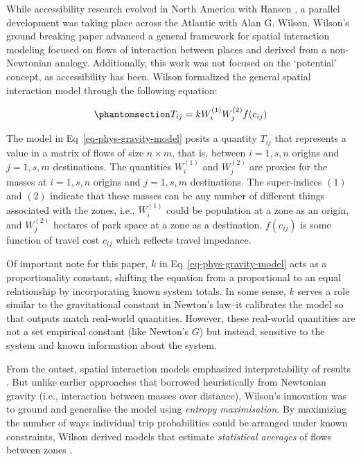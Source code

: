 \documentclass[
  10pt,
  letterpaper,
]{article}
\begin{document}
While accessibility research evolved in North America with Hansen
\citep{hansen1959}, a parallel development was taking place across the
Atlantic with Alan G. Wilson. Wilson's ground breaking paper
\citep{wilson1971} advanced a general framework for spatial interaction
modeling focused on flows of interaction between places and derived from
a non-Newtonian analogy. Additionally, this work was not focused on the
`potential' concept, as accessibility has been. Wilson
\citep{wilson1971} formalized the general spatial interaction model
through the following equation:

\begin{equation}\phantomsection\label{eq-phys-gravity-model}{
T_{ij} = k W_i^{(1)} W_j^{(2)} f(c_{ij})
}\end{equation}

The model in Eq~\ref{eq-phys-gravity-model} posits a quantity \(T_{ij}\)
that represents a value in a matrix of flows of size \(n \times m\),
that is, between \(i = 1,s, n\) origins and \(j = 1,s, m\) destinations.
The quantities \(W_i^{(1)}\) and \(W_j^{(2)}\) are proxies for the
masses at \(i=1,s,n\) origins and \(j=1,s,m\) destinations. The
super-indices \((1)\) and \((2)\) indicate that these masses can be any
number of different things associated with the zones, i.e.,
\(W_i^{(1)}\) could be population at a zone as an origin, and
\(W_j^{(2)}\) hectares of park space at a zone as a destination.
\(f(c_{ij})\) is some function of travel cost \(c_{ij}\) which reflects
travel impedance.

Of important note for this paper, \(k\) in
Eq~\ref{eq-phys-gravity-model} acts as a proportionality constant,
shifting the equation from a proportional to an equal relationship by
incorporating known system totals. In some sense, \(k\) serves a role
similar to the gravitational constant in Newton's law--it calibrates the
model so that outputs match real-world quantities. However, these
real-world quantities are not a set empirical constant (like Newton's
\(G\)) but instead, sensitive to the system and known information about
the system.

From the outset, spatial interaction models emphasized interpretability
of results
\citep{kirbyNormalizingFactorsGravity1970, wilsonSTATISTICALTHEORYSPATIAL1967, wilson1971}.
But unlike earlier approaches that borrowed heuristically from Newtonian
gravity (i.e., interaction between masses over distance), Wilson's
innovation was to ground and generalise the model using \emph{entropy
maximisation}. By maximizing the number of ways individual trip
probabilities could be arranged under known constraints, Wilson derived
models that estimate \emph{statistical averages} of flows between zones
\citep{wilson1971, seniorGravityModellingEntropy1979}.
\end{document}
